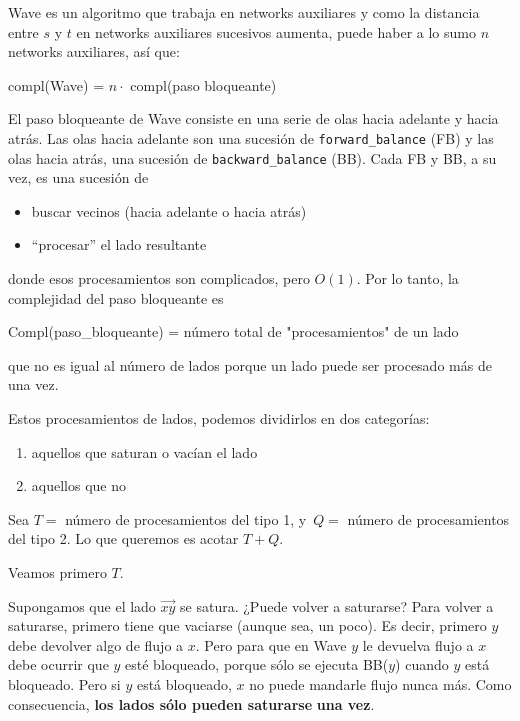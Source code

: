 \documentclass[10pt,a4paper]{article}
\begin{document}
Wave es un algoritmo que trabaja en networks auxiliares y como la distancia entre $s$ y $t$ en networks auxiliares sucesivos aumenta, puede haber a lo sumo $n$ networks auxiliares, así que:

\begin{center}
compl(Wave) = $n \cdot$ compl(paso bloqueante)
\end{center}

El paso bloqueante de Wave consiste en una serie de olas hacia adelante y hacia atrás. Las olas hacia adelante son una sucesión de \texttt{forward\_balance} (FB) y las olas hacia atrás, una sucesión de \texttt{backward\_balance} (BB). Cada FB y BB, a su vez, es una sucesión de

\begin{itemize}

	\item buscar vecinos (hacia adelante o hacia atrás)
	\item ``procesar'' el lado resultante
\end{itemize}

donde esos procesamientos son complicados, pero $O(1)$. Por lo tanto, la complejidad del paso bloqueante es

\begin{center}
Compl(paso_bloqueante) = número total de "procesamientos" de un lado
\end{center}

que no es igual al número de lados porque un lado puede ser procesado más de una vez.

Estos procesamientos de lados, podemos dividirlos en dos categorías:

\begin{enumerate}

	\item aquellos que saturan o vacían el lado
	\item aquellos que no
\end{enumerate}

Sea $T =$ número de procesamientos del tipo 1, y $Q = $ número de procesamientos del tipo 2. Lo que queremos es acotar $T + Q$.

Veamos primero $T$.

Supongamos que el lado $\overrightarrow{xy}$ se satura. ¿Puede volver a saturarse? Para volver a saturarse, primero tiene que vaciarse (aunque sea, un poco). Es decir, primero $y$ debe devolver algo de flujo a $x$. Pero para que en Wave $y$ le devuelva flujo a $x$ debe ocurrir que $y$ esté bloqueado, porque sólo se ejecuta BB($y$) cuando $y$ está bloqueado. Pero si $y $ está bloqueado, $x$ no puede mandarle flujo nunca más. Como consecuencia, \textbf{los lados sólo pueden saturarse} \textbf{una vez}.
\end{document}
